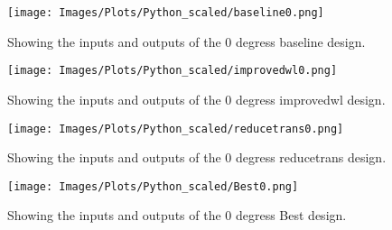 \begin{figure}[htb] 
    \centering
    \texttt{[image: Images/Plots/Python\_scaled/baseline0.png]} 
    \caption{Showing the inputs and outputs of the 0 degress baseline design.} 
    \label{fig:pythonscaled0baseline} 
\end{figure}
\begin{figure}[htb] 
    \centering
    \texttt{[image: Images/Plots/Python\_scaled/improvedwl0.png]} 
    \caption{Showing the inputs and outputs of the 0 degress improvedwl design.} 
    \label{fig:pythonscaled0improvedwl} 
\end{figure}
\begin{figure}[htb] 
    \centering
    \texttt{[image: Images/Plots/Python\_scaled/reducetrans0.png]} 
    \caption{Showing the inputs and outputs of the 0 degress reducetrans design.} 
    \label{fig:pythonscaled0reducetrans} 
\end{figure}
\begin{figure}[htb] 
    \centering
    \texttt{[image: Images/Plots/Python\_scaled/Best0.png]} 
    \caption{Showing the inputs and outputs of the 0 degress Best design.} 
    \label{fig:pythonscaled0Best} 
\end{figure}
